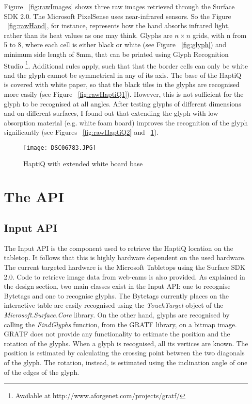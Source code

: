 Figure ~\ref{fig:rawImages} shows three raw images retrieved through the Surface SDK 2.0. The Microsoft PixelSense uses near-infrared sensors. So the Figure ~\ref{fig:rawHand}, for instance, represents how the hand absorbs infrared light, rather than its heat values as one may think. Glyphs are $n \times n$ grids, with n from 5 to 8, where each cell is either black or white (see Figure  ~\ref{fig:glyph}) and minimum side length of 8mm, that can be printed using Glyph Recognition Studio \footnote{Available at http://www.aforgenet.com/projects/gratf/}. Additional rules apply, such that that the border cells can only be white and the glyph cannot be symmetrical in any of its axis. The base of the HaptiQ is covered with white paper, so that the black tiles in the glyphs are recognised more easily (see Figure ~\ref{fig:rawHaptiQ1}). However, this is not sufficient for the glyph to be recognised at all angles. After testing glyphs of different dimensions and on different surfaces, I found out that extending the glyph with low absorption material (e.g. white foam board) improves the recognition of the glyph significantly (see Figures ~\ref{fig:rawHaptiQ2} and ~\ref{fig:whitesurface}).   

\begin{figure}[H]
  \centering
  \texttt{[image: DSC06783.JPG]}
  \caption{HaptiQ with extended white board base}
  \label{fig:whitesurface}
\end{figure}

\section{The API}

\subsection{Input API}

The Input API is the component used to retrieve the HaptiQ location on the tabletop. It follows that this is highly hardware dependent on the used hardware. The current targeted hardware is the Microsoft Tabletops using the Surface SDK 2.0. Code to retrieve image data from web-cams is also provided. 
As explained in the design section, two main classes exist in the Input API: one to recognise Bytetags and one to recognise glyphs. The Bytetags currently places on the interactive table are easily recognised using the \textit{TouchTarget} object of the \textit{Microsoft.Surface.Core} library. On the other hand, glyphs are recognised by calling the \textit{FindGlyphs} function, from the GRATF library, on a bitmap image. GRATF does not provide any functionality to estimate the position and the rotation of the glyphs. When a glyph is recognised, all its vertices are known. The position is estimated by calculating the crossing point between the two diagonals of the glyph. The rotation, instead, is estimated using the inclination angle of one of the edges of the glyph. 

